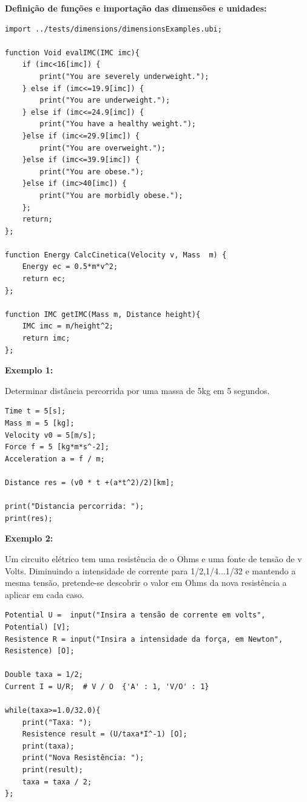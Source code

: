 \documentclass[10pt,portuguese]{article}
\begin{document}
\par \textbf{Definição de funções e importação das dimensões e unidades:}

\begin{lstlisting}
import ../tests/dimensions/dimensionsExamples.ubi;

function Void evalIMC(IMC imc){
    if (imc<16[imc]) {
        print("You are severely underweight.");
    } else if (imc<=19.9[imc]) {
        print("You are underweight.");
    } else if (imc<=24.9[imc]) {
        print("You have a healthy weight.");
    }else if (imc<=29.9[imc]) {
        print("You are overweight.");
    }else if (imc<=39.9[imc]) {
        print("You are obese.");
    }else if (imc>40[imc]) {
        print("You are morbidly obese.");
    };
    return;
};

function Energy CalcCinetica(Velocity v, Mass  m) {
    Energy ec = 0.5*m*v^2;
    return ec;
};

function IMC getIMC(Mass m, Distance height){
    IMC imc = m/height^2;
    return imc;
};
\end{lstlisting}

\par \textbf{Exemplo 1:}

\par Determinar distância percorrida por uma massa de 5kg em 5 segundos.

\begin{lstlisting}
Time t = 5[s];            
Mass m = 5 [kg];
Velocity v0 = 5[m/s];     
Force f = 5 [kg*m*s^-2];
Acceleration a = f / m;

Distance res = (v0 * t +(a*t^2)/2)[km];

print("Distancia percorrida: ");
print(res);
\end{lstlisting}

\clearpage

\par \textbf{Exemplo 2:}

\par Um circuito elétrico tem uma resistência de o Ohms e uma fonte de tensão de v Volts. Diminuindo a intensidade de corrente para 1/2,1/4...1/32 e mantendo a mesma tensão, pretende-se descobrir o valor em Ohms da nova resistência a aplicar em cada caso.

\begin{lstlisting}
Potential U =  input("Insira a tensão de corrente em volts", Potential) [V];
Resistence R = input("Insira a intensidade da força, em Newton", Resistence) [O];

Double taxa = 1/2;
Current I = U/R;  # V / O  {'A' : 1, 'V/O' : 1}

while(taxa>=1.0/32.0){
    print("Taxa: ");
    Resistence result = (U/taxa*I^-1) [O];
    print(taxa);
    print("Nova Resistência: ");
    print(result);
    taxa = taxa / 2;
};
\end{lstlisting}
\end{document}
